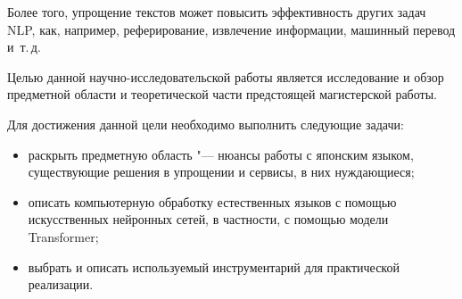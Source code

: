 Более того, упрощение текстов может повысить эффективность других задач NLP, как, например, реферирование, извлечение информации, машинный перевод и~т.\,д.

Целью данной научно-исследовательской работы является исследование и обзор предметной области и теоретической части предстоящей магистерской работы.

Для достижения данной цели необходимо выполнить следующие задачи:
\begin{itemize}%
  \item раскрыть предметную область "--- нюансы работы с японским языком, существующие решения в упрощении и сервисы, в них нуждающиеся;
  \item описать компьютерную обработку естественных языков с помощью искусственных нейронных сетей, в частности, с помощью модели Transformer;
  \item выбрать и описать используемый инструментарий для практической реализации.
\end{itemize}


